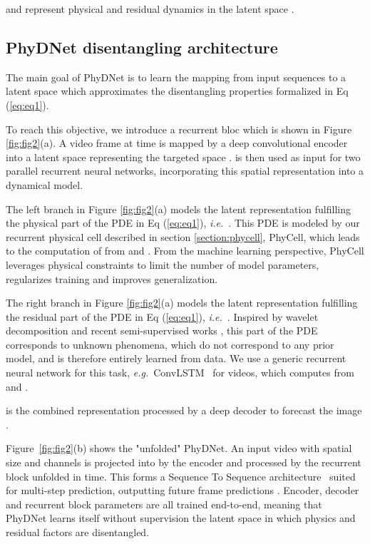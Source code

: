 \documentclass[10pt,twocolumn,letterpaper]{article}
\def\eg{\textit{e.g.}~}
\def\ie{\textit{i.e.}~}
\begin{document}
 and  represent physical and residual dynamics in the latent space .

















\subsection{PhyDNet disentangling architecture}
\label{sec:3.1}



The main goal of PhyDNet is to learn the mapping from input sequences to a latent space which approximates the disentangling properties formalized in Eq (\ref{eq:eq1}). 

To reach this objective, we introduce a recurrent bloc which is shown in Figure \ref{fig:fig2}(a). A video frame  at time  is mapped by a deep convolutional encoder  into a latent space representing the targeted space .  is then used as input for two parallel recurrent neural networks, incorporating this spatial representation into a dynamical model. 

The left branch in Figure \ref{fig:fig2}(a) models the latent representation  fulfilling the physical part of the PDE in Eq (\ref{eq:eq1}), \ie . This PDE is modeled by our recurrent physical cell described in section \ref{section:phycell}, PhyCell, which  leads to the computation of  from  and . From the machine learning perspective, PhyCell leverages physical constraints to limit the number of model parameters, regularizes training and improves generalization.

The right branch in Figure \ref{fig:fig2}(a) models the latent representation  fulfilling the residual part of the PDE in Eq (\ref{eq:eq1}), \ie . Inspired by wavelet decomposition \cite{mallat1999wavelet} and recent semi-supervised works \cite{robert2018hybridnet}, this part of the PDE corresponds to unknown phenomena, which do not correspond to any prior model, and is therefore entirely learned from data. We use a generic recurrent neural network for this task, \eg ConvLSTM~\cite{xingjian2015convolutional} for videos, which computes  from  and . 

 is the combined representation processed by a deep decoder  to forecast the image . 


Figure~\ref{fig:fig2}(b) shows the "unfolded" PhyDNet. An input video  with spatial size  and  channels is projected into  by the
encoder  and processed by the recurrent block unfolded in time. This forms a  Sequence To Sequence architecture~\cite{sutskever2014sequence} suited for multi-step prediction, outputting  future frame predictions . Encoder, decoder and recurrent block parameters are all trained end-to-end, meaning that PhyDNet learns itself without supervision the latent space  in which physics and residual factors are disentangled.
\end{document}
